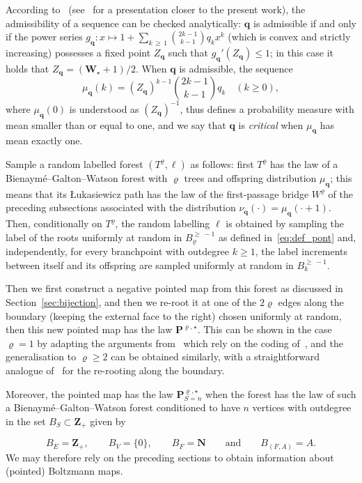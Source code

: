 \documentclass[10pt]{amsart}
\theoremstyle{definition}\newtheorem{defi}[theo]{Definition}\newtheorem{rema}[theo]{Remark}\newtheorem{exam}[theo]{Example}\newtheorem{exem}[theo]{Example}\newtheorem{nota}[theo]{Notation}
\newcommand{\ensembles}[1]{\mathbf{#1}}
\newcommand{\N}{\ensembles{N}}
\newcommand{\Z}{\ensembles{Z}}
\renewcommand{\P}{\ensembles{P}}
\newcommand{\1}{\ensembles{1}}
\newcommand{\q}{\mathbf{q}}
\newcommand{\bfW}{\mathbf{W}}
\renewcommand{\le}{\leqslant}
\renewcommand{\ge}{\geqslant}
\newcommand{\BBmap}{B}
\providecommand{\?}{}
\begin{document}
According to~\cite{MM07} (see~\cite{Mar18b} for a presentation closer to the present work), the admissibility of a sequence can be checked analytically: $\q$ is admissible if and only if the power series $g_\q : x \mapsto 1 + \sum_{k\,\ge\,1} \binom{2k-1}{k-1} q_k x^k$ (which is convex and strictly increasing) possesses a fixed point $Z_\q$ such that $g_\q'(Z_\q)\le1$; in this case it holds that $Z_\q = (\bfW_\star+1)/2$. When $\q$ is admissible, the sequence
\[
\mu_\q(k) = (Z_\q)^{k-1} \binom{2k-1}{k-1} q_k
\quad (k \ge 0),
\]
where $\mu_\q(0)$ is understood as $(Z_\q)^{-1}$, thus defines a probability measure with mean smaller than or equal to one, and we say that $\q$ is \emph{critical} when $\mu_\q$ has mean exactly one.

Sample a random labelled forest $(T^\varrho, \ell)$ as follows: first $T^\varrho$ has the law of a Bienaymé--Galton--Watson forest with $\varrho$ trees and offspring distribution $\mu_\q$; this means that its {\L}ukasiewicz path has the law of the first-passage bridge $W^\varrho$ of the preceding subsections associated with the distribution $\nu_\q(\cdot) = \mu_\q(\cdot+1)$. Then, conditionally on $T^\varrho$, the random labelling $\ell$ is obtained by sampling the label of the roots uniformly at random in $\BBmap_{\varrho}^{\ge\,-1}$ as defined in~\eqref{eq:def_pont} and, independently, for every branchpoint with outdegree $k \ge 1$, the label increments between itself and its offspring are sampled uniformly at random in $\BBmap_{k}^{\ge\,-1}$.

Then we first construct a negative pointed map from this forest as discussed in Section~\ref{sec:bijection}, and then we re-root it at one of the $2\varrho$ edges along the boundary (keeping the external face to the right) chosen uniformly at random, then this new pointed map has the law $\P^{\varrho, \star}$. This can be shown in the case $\varrho = 1$ by adapting the arguments from~\cite{MM07} which rely on the coding of~\cite{BDG04}, and the generalisation to $\varrho \ge 2$ can be obtained similarly, with a straightforward analogue of~\cite[Lemma~10]{BM17} for the re-rooting along the boundary.

Moreover, the pointed map has the law $\P^{\varrho, \star}_{S=n}$ when the forest has the law of such a Bienaymé--Galton--Watson forest conditioned to have $n$ vertices with outdegree in the set $B_S \subset \Z_+$ given by

\[
B_E = \Z_+,
\qquad B_V = \{0\},
\qquad B_F = \N
\qquad\text{and}\qquad B_{(F,A)} = A.
\]
We may therefore rely on the preceding sections to obtain information about (pointed) Boltzmann maps.
\end{document}
